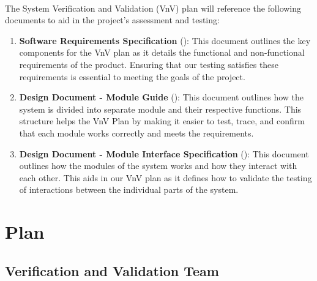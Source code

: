 \documentclass[12pt, titlepage]{article}
\begin{document}
\\
The System Verification and Validation (VnV) plan will reference the following documents to aid in 
the project's assessment and testing:
\begin{enumerate}
  \item \textbf{Software Requirements Specification} (\citet{SRS}): This document outlines the key components 
for the VnV plan as it details the functional and non-functional requirements of the product. Ensuring that our testing 
satisfies these requirements is essential to meeting the goals of the project.
  \item \textbf{Design Document - Module Guide} (\citet{MG}): This document outlines how the system is divided into separate module and their respective functions. 
  This structure helps the VnV Plan by making it easier to test, trace, and confirm that each module works correctly and meets the requirements.
  \item \textbf{Design Document - Module Interface Specification} (\citet{MIS}): This document outlines how the modules of the system works and how they interact with each other.
  This aids in our VnV plan as it defines how to validate the testing of interactions between the individual parts of the system.
\end{enumerate}

\section{Plan}


\subsection{Verification and Validation Team}

\end{document}
